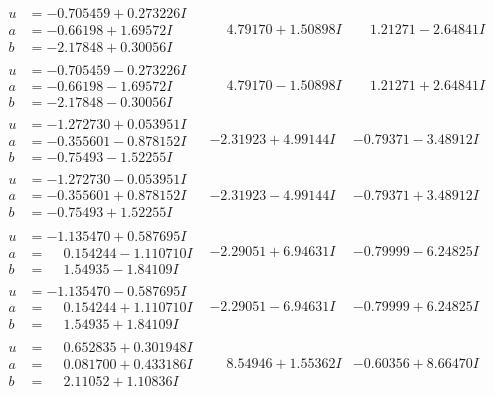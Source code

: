 \documentclass[1p]{elsarticle_modified}
\theoremstyle{definition}
\begin{document}
$$\begin{array}{c|c|c}
\begin{aligned}
u &= -0.705459 + 0.273226 I \\
a &= -0.66198 + 1.69572 I \\
b &= -2.17848 + 0.30056 I\end{aligned}
 & \phantom{-}4.79170 + 1.50898 I & \phantom{-}1.21271 - 2.64841 I \\ \hline\begin{aligned}
u &= -0.705459 - 0.273226 I \\
a &= -0.66198 - 1.69572 I \\
b &= -2.17848 - 0.30056 I\end{aligned}
 & \phantom{-}4.79170 - 1.50898 I & \phantom{-}1.21271 + 2.64841 I \\ \hline\begin{aligned}
u &= -1.272730 + 0.053951 I \\
a &= -0.355601 - 0.878152 I \\
b &= -0.75493 - 1.52255 I\end{aligned}
 & -2.31923 + 4.99144 I & -0.79371 - 3.48912 I \\ \hline\begin{aligned}
u &= -1.272730 - 0.053951 I \\
a &= -0.355601 + 0.878152 I \\
b &= -0.75493 + 1.52255 I\end{aligned}
 & -2.31923 - 4.99144 I & -0.79371 + 3.48912 I \\ \hline\begin{aligned}
u &= -1.135470 + 0.587695 I \\
a &= \phantom{-}0.154244 - 1.110710 I \\
b &= \phantom{-}1.54935 - 1.84109 I\end{aligned}
 & -2.29051 + 6.94631 I & -0.79999 - 6.24825 I \\ \hline\begin{aligned}
u &= -1.135470 - 0.587695 I \\
a &= \phantom{-}0.154244 + 1.110710 I \\
b &= \phantom{-}1.54935 + 1.84109 I\end{aligned}
 & -2.29051 - 6.94631 I & -0.79999 + 6.24825 I \\ \hline\begin{aligned}
u &= \phantom{-}0.652835 + 0.301948 I \\
a &= \phantom{-}0.081700 + 0.433186 I \\
b &= \phantom{-}2.11052 + 1.10836 I\end{aligned}
 & \phantom{-}8.54946 + 1.55362 I & -0.60356 + 8.66470 I \\ \hline\begin{aligned}

\end{aligned}
\end{array}$$
\end{document}
